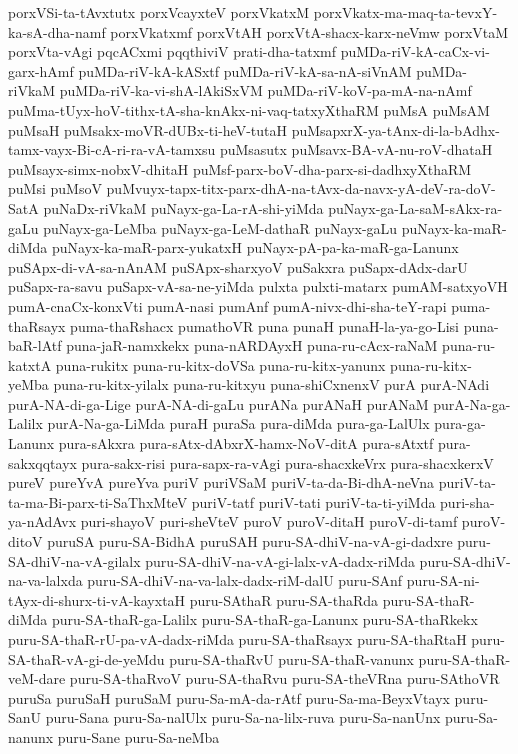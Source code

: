 {porxVSi-ta-tAvxtutx
porxVcayxteV
porxVkatxM
porxVkatx-ma-maq-ta-tevxY-ka-sA-dha-namf
porxVkatxmf
porxVtAH
porxVtA-shacx-karx-neVmw
porxVtaM
porxVta-vAgi
pqcACxmi
pqqthiviV
prati-dha-tatxmf
puMDa-riV-kA-caCx-vi-garx-hAmf
puMDa-riV-kA-kASxtf
puMDa-riV-kA-sa-nA-siVnAM
puMDa-riVkaM
puMDa-riV-ka-vi-shA-lAkiSxVM
puMDa-riV-koV-pa-mA-na-nAmf
puMma-tUyx-hoV-tithx-tA-sha-knAkx-ni-vaq-tatxyXthaRM
puMsA
puMsAM
puMsaH
puMsakx-moVR-dUBx-ti-heV-tutaH
puMsapxrX-ya-tAnx-di-la-bAdhx-tamx-vayx-Bi-cA-ri-ra-vA-tamxsu
puMsasutx
puMsavx-BA-vA-nu-roV-dhataH
puMsayx-simx-nobxV-dhitaH
puMsf-parx-boV-dha-parx-si-dadhxyXthaRM
puMsi
puMsoV
puMvuyx-tapx-titx-parx-dhA-na-tAvx-da-navx-yA-deV-ra-doV-SatA
puNaDx-riVkaM
puNayx-ga-La-rA-shi-yiMda
puNayx-ga-La-saM-sAkx-ra-gaLu
puNayx-ga-LeMba
puNayx-ga-LeM-dathaR
puNayx-gaLu
puNayx-ka-maR-diMda
puNayx-ka-maR-parx-yukatxH
puNayx-pA-pa-ka-maR-ga-Lanunx
puSApx-di-vA-sa-nAnAM
puSApx-sharxyoV
puSakxra
puSapx-dAdx-darU
puSapx-ra-savu
puSapx-vA-sa-ne-yiMda
pulxta
pulxti-matarx
pumAM-satxyoVH
pumA-cnaCx-konxVti
pumA-nasi
pumAnf
pumA-nivx-dhi-sha-teY-rapi
puma-thaRsayx
puma-thaRshacx
pumathoVR
puna
punaH
punaH-la-ya-go-Lisi
puna-baR-lAtf
puna-jaR-namxkekx
puna-nARDAyxH
puna-ru-cAcx-raNaM
puna-ru-katxtA
puna-rukitx
puna-ru-kitx-doVSa
puna-ru-kitx-yanunx
puna-ru-kitx-yeMba
puna-ru-kitx-yilalx
puna-ru-kitxyu
puna-shiCxnenxV
purA
purA-NAdi
purA-NA-di-ga-Lige
purA-NA-di-gaLu
purANa
purANaH
purANaM
purA-Na-ga-Lalilx
purA-Na-ga-LiMda
puraH
puraSa
pura-diMda
pura-ga-LalUlx
pura-ga-Lanunx
pura-sAkxra
pura-sAtx-dAbxrX-hamx-NoV-ditA
pura-sAtxtf
pura-sakxqqtayx
pura-sakx-risi
pura-sapx-ra-vAgi
pura-shacxkeVrx
pura-shacxkerxV
pureV
pureYvA
pureYva
puriV
puriVSaM
puriV-ta-da-Bi-dhA-neVna
puriV-ta-ta-ma-Bi-parx-ti-SaThxMteV
puriV-tatf
puriV-tati
puriV-ta-ti-yiMda
puri-sha-ya-nAdAvx
puri-shayoV
puri-sheVteV
puroV
puroV-ditaH
puroV-di-tamf
puroV-ditoV
puruSA
puru-SA-BidhA
puruSAH
puru-SA-dhiV-na-vA-gi-dadxre
puru-SA-dhiV-na-vA-gilalx
puru-SA-dhiV-na-vA-gi-lalx-vA-dadx-riMda
puru-SA-dhiV-na-va-lalxda
puru-SA-dhiV-na-va-lalx-dadx-riM-dalU
puru-SAnf
puru-SA-ni-tAyx-di-shurx-ti-vA-kayxtaH
puru-SAthaR
puru-SA-thaRda
puru-SA-thaR-diMda
puru-SA-thaR-ga-Lalilx
puru-SA-thaR-ga-Lanunx
puru-SA-thaRkekx
puru-SA-thaR-rU-pa-vA-dadx-riMda
puru-SA-thaRsayx
puru-SA-thaRtaH
puru-SA-thaR-vA-gi-de-yeMdu
puru-SA-thaRvU
puru-SA-thaR-vanunx
puru-SA-thaR-veM-dare
puru-SA-thaRvoV
puru-SA-thaRvu
puru-SA-theVRna
puru-SAthoVR
puruSa
puruSaH
puruSaM
puru-Sa-mA-da-rAtf
puru-Sa-ma-BeyxVtayx
puru-SanU
puru-Sana
puru-Sa-nalUlx
puru-Sa-na-lilx-ruva
puru-Sa-nanUnx
puru-Sa-nanunx
puru-Sane
puru-Sa-neMba
}

